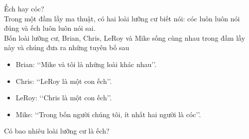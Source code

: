 \begin{bt}%
	Ếch hay cóc?\\ 
	Trong một đầm lầy ma thuật, có  hai loài lưỡng cư biết nói: cóc luôn luôn nói đúng và ếch luôn luôn nói sai.\\
	Bốn loài lưỡng cư, Brian, Chris, LeRoy và Mike sống cùng nhau trong đầm lầy này và chúng đưa ra những tuyên  bố sau
	\begin{itemize}
		\item Brian: \lq \lq Mike và tôi là những loài khác nhau\rq  \rq.
		\item Chris:  \lq \lq LeRoy là một con ếch\rq \rq.
		\item LeRoy: \lq \lq Chris là một con ếch\rq  \rq.
		\item Mike: \lq \lq Trong bốn người  chúng tôi, ít nhất hai người là cóc\rq \rq.
	\end{itemize}
	 Có bao nhiêu loài lưỡng cư là ếch?
\end{bt}


